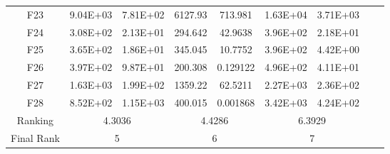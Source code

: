 \begin{table*}[htbp]
\begin{tabular}{|c|cc|cc|cc|cc|}
    F23   & 9.04E+03 & 7.81E+02 & 6127.93 & 713.981 & 1.63E+04 & 3.71E+03 \\
    F24   & 3.08E+02 & 2.13E+01 & 294.642 & 42.9638 & 3.96E+02 & 2.18E+01 \\
    F25   & 3.65E+02 & 1.86E+01 & 345.045 & 10.7752 & 3.96E+02 & 4.42E+00 \\
    F26   & 3.97E+02 & 9.87E+01 & 200.308 & 0.129122 & 4.96E+02 & 4.11E+01 \\
    F27   & 1.63E+03 & 1.99E+02 & 1359.22 & 62.5211 & 2.27E+03 & 2.36E+02 \\
    F28   & 8.52E+02 & 1.15E+03 & 400.015 & 0.001868 & 3.42E+03 & 4.24E+02 \\
    \cline{1-7}
    Ranking & \multicolumn{2}{c|}{4.3036} & \multicolumn{2}{c|}{4.4286} & \multicolumn{2}{c|}{6.3929} \\
    \cline{1-7}
    Final Rank & \multicolumn{2}{c|}{5} & \multicolumn{2}{c|}{6} & \multicolumn{2}{c|}{7} \\
    \cline{1-7}
    \end{tabular}%
  \label{tab:AG_CEC13_EAs50D}%
\end{table*}%


